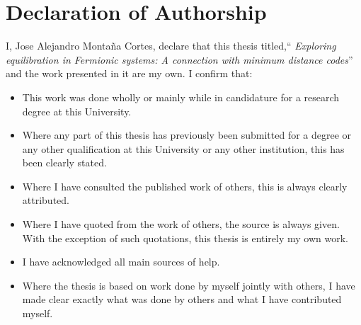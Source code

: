 
\chapter*{Declaration of Authorship}
I, Jose Alejandro Montaña Cortes, declare that this thesis titled,`` \textit{Exploring equilibration in Fermionic systems: A connection with minimum distance codes}'' and the work presented in it are my own. I confirm that:

\begin{itemize} 
\item This work was done wholly or mainly while in candidature for a research degree at this University.
\item Where any part of this thesis has previously been submitted for a degree or any other qualification at this University or any other institution, this has been clearly stated.
\item Where I have consulted the published work of others, this is always clearly attributed.
\item Where I have quoted from the work of others, the source is always given. With the exception of such quotations, this thesis is entirely my own work.
\item I have acknowledged all main sources of help.
\item Where the thesis is based on work done by myself jointly with others, I have made clear exactly what was done by others and what I have contributed myself.\\
\end{itemize}
 

